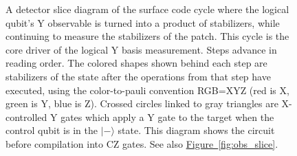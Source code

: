 \documentclass[onecolumn,unpublished,a4paper]{quantumarticle}
\theoremstyle{definition}
\theoremstyle{definition}
\theoremstyle{definition}
\newcommand{\fig}[1]{\hyperref[fig:#1]{Figure~\ref*{fig:#1}}}
\begin{document}
\begin{figure}
    \centering
    \caption{
        A detector slice diagram of the surface code cycle where the logical qubit's Y observable is turned into a product of stabilizers, while continuing to measure the stabilizers of the patch.
        This cycle is the core driver of the logical Y basis measurement.
        Steps advance in reading order.
        The colored shapes shown behind each step are stabilizers of the state after the operations from that step have executed, using the color-to-pauli convention RGB=XYZ (red is X, green is Y, blue is Z).
        Crossed circles linked to gray triangles are X-controlled Y gates which apply a Y gate to the target when the control qubit is in the $|-\rangle$ state.
        This diagram shows the circuit before compilation into CZ gates.
        See also \fig{obs_slice}.
}
\end{figure}
\end{document}
